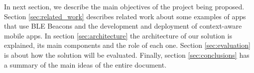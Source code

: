In next section, we describe the main
objectives of the project being proposed.
Section \ref{sec:related_work} describes related
work about some examples of apps that use BLE Beacons
and the development and deployment of
context-aware mobile apps.
In section \ref{sec:architecture} the architecture of our
solution is explained, 
its main components and the role of
each one.
Section \ref{sec:evaluation} is about how the solution
will be evaluated.
Finally, section \ref{sec:conclusions} has a summary of
the main ideas of the entire document.
